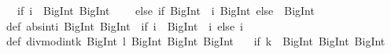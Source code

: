 \begin{isabellebody}
\begin{isamarkuptext}
\ \ {}if\ {}i\ {}{}\ BigInt{}{}{}{}\ BigInt{}{}{}\isanewline
\ \ \ \ else\ {}if\ {}BigInt{}{}{}\ {}\ i{}\ BigInt{}{}{}\ else\ {}{}\ BigInt{}{}{}{}{}{}\isanewline
\isanewline
def\ abs{}int{}i{}\ BigInt{}{}\ BigInt\ {}\ {}if\ {}i\ {}\ BigInt{}{}{}{}\ {}{}\ i{}\ else\ i{}\isanewline
\isanewline
def\ divmod{}int{}k{}\ BigInt{}\ l{}\ BigInt{}{}\ {}BigInt{}\ BigInt{}\ {}\isanewline
\ \ {}if\ {}k\ {}{}\ BigInt{}{}{}{}\ {}BigInt{}{}{}{}\ BigInt{}{}{}{}\isanewline

\end{isamarkuptext}
\end{isabellebody}
